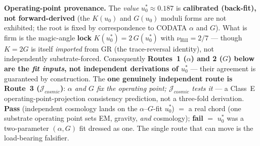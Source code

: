 \noindent\textbf{Operating-point provenance.} The \emph{value} $u_0^* \approx 0.187$ is \textbf{calibrated (back-fit), not forward-derived} (the $K(u_0)$ and $G(u_0)$ moduli forms are not exhibited; the root is fixed by correspondence to CODATA $\alpha$ and $G$). What is firm is the magic-angle \textbf{lock} $K(u_0^*) = 2\,G(u_0^*)$ with $\nu_{\mathrm{Hill}} = 2/7$ --- though $K = 2G$ is itself \emph{imported} from GR (the trace-reversal identity), not independently substrate-forced. Consequently \textbf{Routes~1 ($\alpha$) and 2 ($G$) below are the \emph{fit inputs}, not independent derivations of $u_0^*$} --- their agreement is guaranteed by construction. The \textbf{one genuinely independent route is Route~3 ($\mathcal{J}_{cosmic}$)}: \emph{$\alpha$ and $G$ fix the operating point; $\mathcal{J}_{cosmic}$ tests it} --- a Class~E operating-point-projection consistency prediction, not a three-fold derivation. \textbf{Pass} (independent cosmology lands on the $\alpha$--$G$-fit $u_0^*$) $=$ a real chord (one substrate operating point sets EM, gravity, \emph{and} cosmology); \textbf{fail} $=$ $u_0^*$ was a two-parameter $(\alpha,G)$ fit dressed as one. The single route that can move is the load-bearing falsifier.

